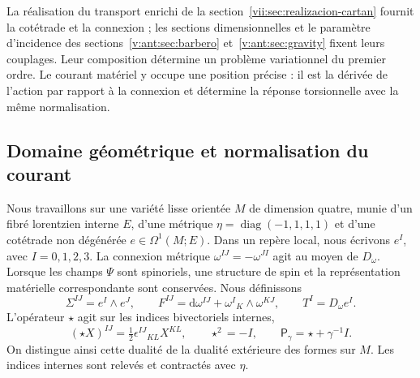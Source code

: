 La réalisation du transport enrichi de la
section~\ref{vii:sec:realizacion-cartan} fournit la cotétrade et la
connexion ; les sections dimensionnelles et le paramètre d'incidence des
sections~\ref{v:ant:sec:barbero} et~\ref{v:ant:sec:gravity} fixent leurs couplages. Leur composition
détermine un problème variationnel du premier ordre. Le courant matériel
y occupe une position précise : il est la dérivée de l'action par rapport à
la connexion et détermine la réponse torsionnelle avec la même normalisation.

\subsection{Domaine géométrique et normalisation du courant}
\label{vii:subsec:dominio-corriente-cartan}

Nous travaillons sur une variété lisse orientée \(M\) de dimension quatre, munie d'un fibré lorentzien interne \(E\), d'une métrique \(\eta=\operatorname{diag}(-1,1,1,1)\) et d'une cotétrade non dégénérée \(e\in\Omega^1(M;E)\). Dans un repère local, nous écrivons \(e^I\), avec \(I=0,1,2,3\). La connexion métrique \(\omega^{IJ}=-\omega^{JI}\) agit au moyen de \(D_\omega\). Lorsque les champs \(\Psi\) sont spinoriels, une structure de spin et la représentation matérielle correspondante sont conservées. Nous définissons
\begin{equation}
 \Sigma^{IJ}=e^I\wedge e^J,\qquad
 F^{IJ}=\mathrm d\omega^{IJ}+\omega^I{}_{K}\wedge\omega^{KJ},
 \qquad T^I=D_\omega e^I.
 \label{vii:eq:campos-cartan}
\end{equation}
L'opérateur \(\star\) agit sur les indices bivectoriels internes,
\begin{equation}
 (\star X)^{IJ}=\tfrac12\epsilon^{IJ}{}_{KL}X^{KL},
 \qquad \star^2=-I,\qquad
 \mathsf P_\gamma=\star+\gamma^{-1}I.
 \label{vii:eq:operador-holst}
\end{equation}
On distingue ainsi cette dualité de la dualité extérieure des formes sur
\(M\). Les indices internes sont relevés et contractés avec \(\eta\).


